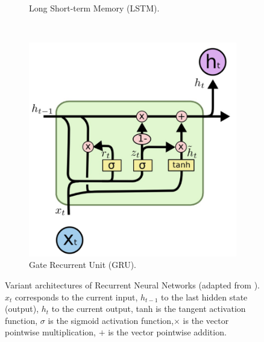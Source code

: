 \begin{figure}[!ht]
\begin{subfigure}[t]{0.45\textwidth}
      \caption{Long Short-term Memory (LSTM).} \label{fig:lstm}
    \end{subfigure}\\
    \vspace{3em}
    \begin{subfigure}[t]{0.45\textwidth}
      \includegraphics[width=\linewidth]{imgs/models/gru-2.png}
      \caption{Gate Recurrent Unit (GRU).} \label{fig:gru}
    \end{subfigure} 
  \caption{Variant architectures of Recurrent Neural Networks (adapted from \citet{olahUnderstandingLSTMNetworks2015}).  $x_t$ corresponds to the current input, $h_{t-1}$ to the last hidden state (output), $h_t$ to the current output, tanh is the tangent activation function, $\sigma$ is the sigmoid activation function,$\times$ is the vector pointwise multiplication, $+$ is the vector pointwise addition.} \label{fig:recurrent-nn}
\end{figure}

